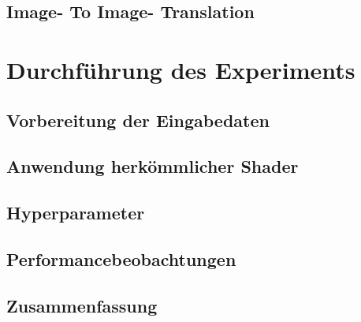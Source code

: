 \section{Image- To Image- Translation}
\label{sec:nst}



\chapter{Durchführung des Experiments}
\label{ch:conduct}

\section{Vorbereitung der Eingabedaten}
\label{sec:preparation}

\section{Anwendung herkömmlicher Shader}
\label{sec:shader}

\section{Hyperparameter}
\label{sec:hyperparams}

\section{Performancebeobachtungen}
\label{sec:performance}

\section{Zusammenfassung}
\label{sec:conclusion}
